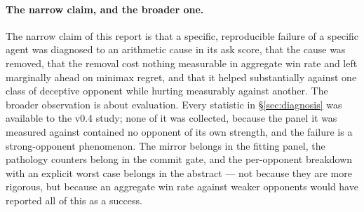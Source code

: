 \paragraph{The narrow claim, and the broader one.} The narrow claim of this
report is that a specific, reproducible failure of a specific agent was
diagnosed to an arithmetic cause in its ask score, that the cause was removed,
that the removal cost nothing measurable in aggregate win rate and left \vfour{}
marginally ahead on minimax regret, and that it helped substantially against one
class of deceptive opponent while hurting measurably against another.
The broader observation is
about evaluation. Every statistic in \S\ref{sec:diagnosis} was available to the
v0.4 study; none of it was collected, because the panel it was measured against
contained no opponent of its own strength, and the failure is a strong-opponent
phenomenon. The mirror belongs in the fitting panel, the pathology counters
belong in the commit gate, and the per-opponent breakdown with an explicit worst
case belongs in the abstract --- not because they are more rigorous, but because
an aggregate win rate against weaker opponents would have reported all of this
as a success.
